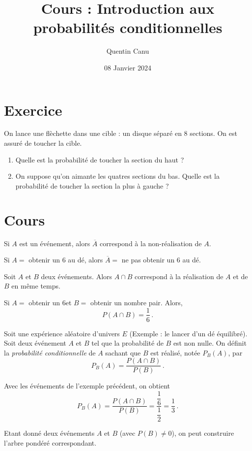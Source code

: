 \documentclass{article}
\title{Cours : Introduction aux probabilités conditionnelles}
\author{Quentin Canu}
\date{08 Janvier 2024}
\begin{document}
\maketitle
\section{Exercice}
On lance une flèchette dans une cible : un disque séparé en 8 sections. On est assuré de toucher la cible. 
\begin{enumerate}
\item Quelle est la probabilité de toucher la section du haut ?
\item On suppose qu'on aimante les quatres sections du bas. Quelle est la probabilité de toucher la section la plus à gauche ?
\end{enumerate}
\section{Cours}
\begin{definition}
Si $A$ est un événement, alors $\overline{A}$ correspond à la non-réalisation de $A$.
\end{definition}
\begin{example}
Si $A =$ \og obtenir un $6$ au dé\fg, alors $\overline{A} =$ \og ne pas obtenir un $6$ au dé\fg.
\end{example}
\begin{definition}
Soit $A$ et $B$ deux événements. Alors $A \cap B$ correspond à la réalisation de $A$ et de $B$ en même temps.
\end{definition}
\begin{example}
Si $A =$ \og obtenir un $6$\fg et $B =$ \og obtenir un nombre pair\fg. Alors,
\begin{equation*}
P(A \cap B) = \dfrac{1}{6}\,.
\end{equation*}
\end{example}
\begin{definition}
Soit une expérience aléatoire d'univers $E$ (Exemple : le lancer d'un dé équilibré). Soit deux événement $A$ et $B$ tel que la probabilité de $B$ est non nulle. On définit la \emph{probabilité conditionnelle} de $A$ sachant que $B$ est réalisé, notée $P_B(A)$, par
\begin{equation*}
P_B(A) = \dfrac{P(A \cap B)}{P(B)}\,.
\end{equation*}
\end{definition}
\begin{example}
Avec les événements de l'exemple précédent, on obtient
\begin{equation*}
P_B(A) = \dfrac{P(A \cap B)}{P(B)} = \dfrac{\dfrac{1}{6}}{\dfrac{1}{2}} = \dfrac{1}{3}\,.
\end{equation*} 
\end{example}
Etant donné deux événements $A$ et $B$ (avec $P(B) \neq 0$), on peut construire l'arbre pondéré correspondant.
\end{document}
